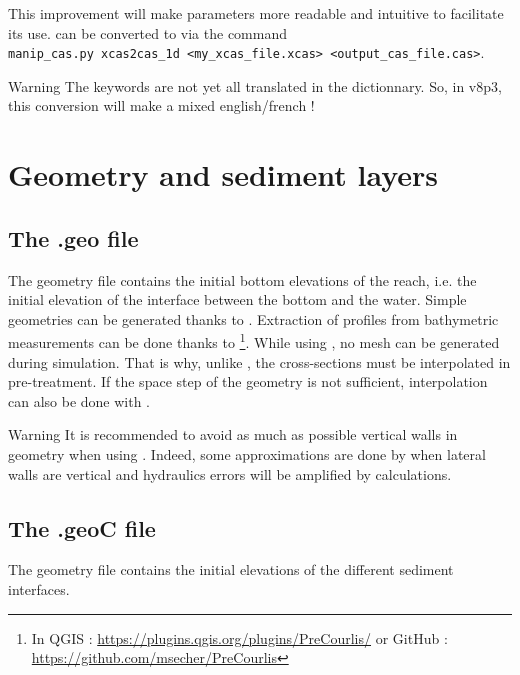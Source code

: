 This improvement will make \mascaret parameters more readable and intuitive to facilitate its use.
\xcass can be converted to \cas via the command \\
\verb|manip_cas.py xcas2cas_1d <my_xcas_file.xcas> <output_cas_file.cas>|.

\begin{CommentBlock}{Warning}
	The keywords are not yet all translated in the dictionnary. So, in v8p3, this conversion will make a mixed english/french \cas !
\end{CommentBlock}

\section{Geometry and sediment layers}
\label{sedi_layers}

\subsection{The .geo file}
\label{geo_file}

The geometry file contains the initial bottom elevations of the reach, i.e. the initial elevation of the interface between the bottom and the water. 
Simple geometries can be generated thanks to \fudaa. Extraction of profiles from bathymetric measurements can be done thanks to \precourlis\footnote{In QGIS : \url{https://plugins.qgis.org/plugins/PreCourlis/} or GitHub : \url{https://github.com/msecher/PreCourlis}}.
While using \courlis, no mesh can be generated during simulation. That is why, unlike \mascaret, the cross-sections must be interpolated in pre-treatment.
If the space step of the geometry is not sufficient, interpolation can also be done with \precourlis.

\begin{CommentBlock}{Warning}
	It is recommended to avoid as much as possible vertical walls in geometry when using \courlis. Indeed, some approximations are done by \mascaret when lateral walls are vertical and hydraulics errors will be amplified by \courlis calculations. 
\end{CommentBlock}

\subsection{The .geoC file}
\label{geoC_file}

The \courlis geometry file contains the initial elevations of the different sediment interfaces. 

